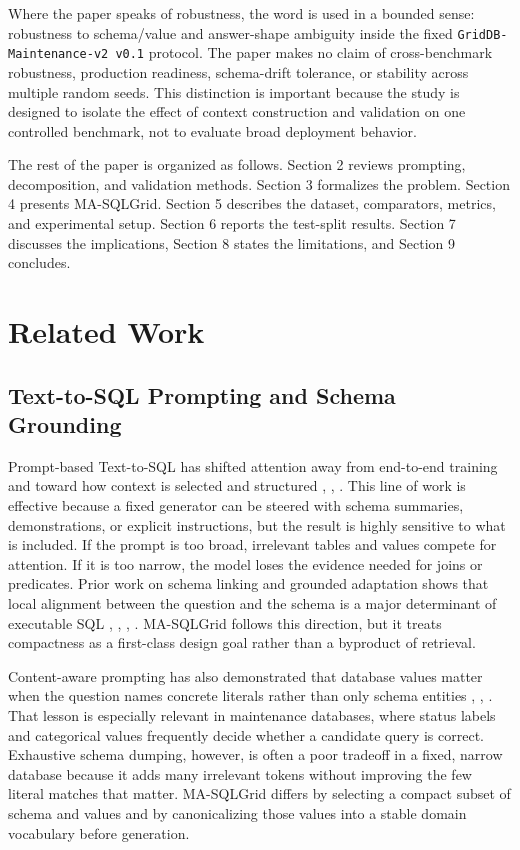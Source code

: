 \documentclass{ieeeaccess}
\begin{document}
Where the paper speaks of robustness, the word is used in a bounded sense: robustness to schema/value and answer-shape ambiguity inside the fixed \texttt{GridDB-Maintenance-v2\ v0.1} protocol. The paper makes no claim of cross-benchmark robustness, production readiness, schema-drift tolerance, or stability across multiple random seeds. This distinction is important because the study is designed to isolate the effect of context construction and validation on one controlled benchmark, not to evaluate broad deployment behavior.

The rest of the paper is organized as follows. Section 2 reviews prompting, decomposition, and validation methods. Section 3 formalizes the problem. Section 4 presents MA-SQLGrid. Section 5 describes the dataset, comparators, metrics, and experimental setup. Section 6 reports the test-split results. Section 7 discusses the implications, Section 8 states the limitations, and Section 9 concludes.

\section{Related Work}\label{related-work}

\subsection{Text-to-SQL Prompting and Schema Grounding}\label{text-to-sql-prompting-and-schema-grounding}

Prompt-based Text-to-SQL has shifted attention away from end-to-end training and toward how context is selected and structured \cite{chang2023prompt}, \cite{nan2023enhancing}, \cite{sun2023sqlprompt}. This line of work is effective because a fixed generator can be steered with schema summaries, demonstrations, or explicit instructions, but the result is highly sensitive to what is included. If the prompt is too broad, irrelevant tables and values compete for attention. If it is too narrow, the model loses the evidence needed for joins or predicates. Prior work on schema linking and grounded adaptation shows that local alignment between the question and the schema is a major determinant of executable SQL \cite{lei2020reexamining}, \cite{liu2021awakening}, \cite{liu2022semantic}, \cite{gan2021robustness}. MA-SQLGrid follows this direction, but it treats compactness as a first-class design goal rather than a byproduct of retrieval.

Content-aware prompting has also demonstrated that database values matter when the question names concrete literals rather than only schema entities \cite{herzig2020tapas}, \cite{chen2023large}, \cite{zhang2024structure}. That lesson is especially relevant in maintenance databases, where status labels and categorical values frequently decide whether a candidate query is correct. Exhaustive schema dumping, however, is often a poor tradeoff in a fixed, narrow database because it adds many irrelevant tokens without improving the few literal matches that matter. MA-SQLGrid differs by selecting a compact subset of schema and values and by canonicalizing those values into a stable domain vocabulary before generation.
\end{document}
